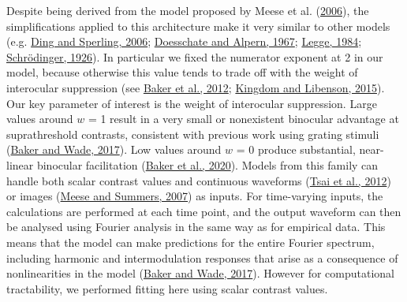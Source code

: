 \documentclass[
]{article}
\begin{document}
Despite being derived from the model proposed by Meese et al. (\protect\hyperlink{ref-Meese2006}{2006}), the simplifications applied to this architecture make it very similar to other models (e.g. \protect\hyperlink{ref-Ding2006}{Ding and Sperling, 2006}; \protect\hyperlink{ref-Doesschate1967}{Doesschate and Alpern, 1967}; \protect\hyperlink{ref-Legge1984}{Legge, 1984}; \protect\hyperlink{ref-Schrodinger1926}{Schrödinger, 1926}). In particular we fixed the numerator exponent at 2 in our model, because otherwise this value tends to trade off with the weight of interocular suppression (see \protect\hyperlink{ref-Baker2012}{Baker et al., 2012}; \protect\hyperlink{ref-Kingdom2015}{Kingdom and Libenson, 2015}). Our key parameter of interest is the weight of interocular suppression. Large values around \(w\) = 1 result in a very small or nonexistent binocular advantage at suprathreshold contrasts, consistent with previous work using grating stimuli (\protect\hyperlink{ref-Baker2017}{Baker and Wade, 2017}). Low values around \(w\) = 0 produce substantial, near-linear binocular facilitation (\protect\hyperlink{ref-Baker2020}{Baker et al., 2020}). Models from this family can handle both scalar contrast values and continuous waveforms (\protect\hyperlink{ref-Tsai2012}{Tsai et al., 2012}) or images (\protect\hyperlink{ref-Meese2007}{Meese and Summers, 2007}) as inputs. For time-varying inputs, the calculations are performed at each time point, and the output waveform can then be analysed using Fourier analysis in the same way as for empirical data. This means that the model can make predictions for the entire Fourier spectrum, including harmonic and intermodulation responses that arise as a consequence of nonlinearities in the model (\protect\hyperlink{ref-Baker2017}{Baker and Wade, 2017}). However for computational tractability, we performed fitting here using scalar contrast values.
\end{document}
